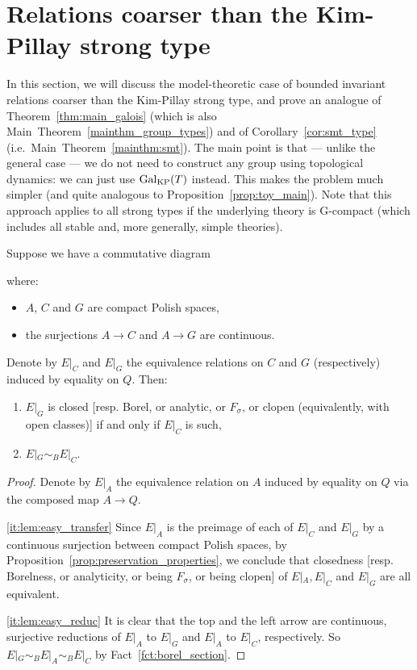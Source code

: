 	
	\section{Relations coarser than the Kim-Pillay strong type}\label{section: relations coarser than the Kim-Pillay strong type}
	In this section, we will discuss the model-theoretic case of bounded invariant relations coarser than the Kim-Pillay strong type, and prove an analogue of Theorem~\ref{thm:main_galois} (which is also Main~Theorem~\ref{mainthm_group_types}) and of Corollary~\ref{cor:smt_type} (i.e.\ Main~Theorem~\ref{mainthm:smt}). The main point is that --- unlike the general case --- we do not need to construct any group using topological dynamics: we can just use $\operatorname{{Gal}}_{\mathrm{KP}}(T)$ instead. This makes the problem much simpler (and quite analogous to Proposition~\ref{prop:toy_main}). Note that this approach applies to all strong types if the underlying theory is G-compact (which includes all stable and, more generally, simple theories).
	
	\begin{lem}
		\label{lem:easy}
		Suppose we have a commutative diagram
		\begin{center}
		\end{center}
		
		where:
		\begin{itemize}
			\item
			$A$, $C$ and $G$ are compact Polish spaces,
			\item
			the surjections $A \to C$ and $A \to G$ are continuous.
		\end{itemize}
		Denote by $E|_C$ and $E|_G$ the equivalence relations on $C$ and $G$ (respectively) induced by equality on $Q$. Then:
		\begin{enumerate}
			\item
			\label{it:lem:easy_transfer}
			$E|_G$ is closed [resp. Borel, or analytic, or $F_\sigma$, or clopen (equivalently, with open classes)] if and only if $E|_C$ is such,
			\item
			\label{it:lem:easy_reduc}
			$E|_G\sim _B E|_C$.
		\end{enumerate}
	\end{lem}
	\begin{proof}
		Denote by $E|_A$ the equivalence relation on $A$ induced by equality on $Q$ via the composed map $A\to Q$.
		
		\ref{it:lem:easy_transfer} Since $E|_A$ is the preimage of each of $E|_C$ and $E|_G$ by a continuous surjection between compact Polish spaces, by Proposition~\ref{prop:preservation_properties}, we conclude that closedness [resp. Borelness, or analyticity, or being $F_\sigma$, or being clopen] of $E|_A,E|_C$ and $E|_G$ are all equivalent.
		
		\ref{it:lem:easy_reduc}
		It is clear that the top and the left arrow are continuous, surjective reductions of $E|_A$ to $E|_G$ and $E|_A$ to $E|_C$, respectively. So $E|_G \sim_B E|_A \sim_B E|_C$ by Fact~\ref{fct:borel_section}.
	\end{proof}
	
